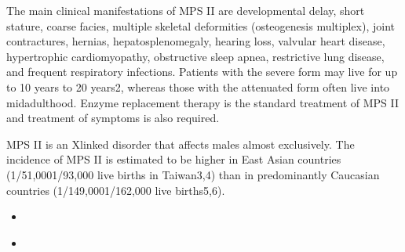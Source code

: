 \documentclass[letterpaper,10pt,english]{jupyterBook}
\begin{document}
\sphinxAtStartPar
The main clinical manifestations of MPS II are developmental delay, short stature, coarse facies, multiple skeletal deformities (osteogenesis multiplex), joint contractures, hernias, hepatosplenomegaly, hearing loss, valvular heart disease, hypertrophic cardiomyopathy, obstructive sleep apnea, restrictive lung disease, and frequent respiratory infections. Patients with the severe form may live for up to 10 years to 20 years2, whereas those with the attenuated form often live into mid\sphinxhyphen{}adulthood. Enzyme replacement therapy is the standard treatment of MPS II and treatment of symptoms is also required.

\sphinxAtStartPar
MPS II is an X\sphinxhyphen{}linked disorder that affects males almost exclusively. The incidence of MPS II is estimated to be higher in East Asian countries (1/51,000\sphinxhyphen{}1/93,000 live births in Taiwan3,4) than in predominantly Caucasian countries (1/149,000\sphinxhyphen{}1/162,000 live births5,6).

\begin{DUlineblock}{0em}
\item[] 
\end{DUlineblock}

\begin{sphinxVerbatim}[commandchars=\\\{\}]
\end{sphinxVerbatim}

\begin{DUlineblock}{0em}
\item[] 
\end{DUlineblock}
\begin{itemize}
\item {} 
\sphinxAtStartPar
{\hyperref[\detokenize{ipynb/chapter1::doc}]{}}

\item {} 
\sphinxAtStartPar
{\hyperref[\detokenize{ipynb/chapter2::doc}]{}}

\end{itemize}
\end{document}
